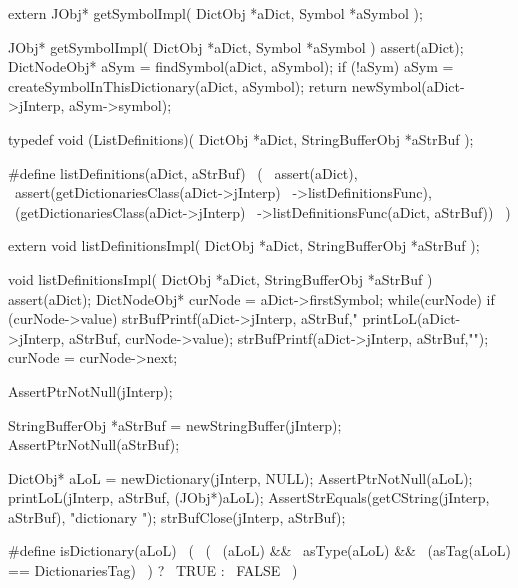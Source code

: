 \startCHeader
extern JObj* getSymbolImpl(
  DictObj *aDict,
  Symbol  *aSymbol
);
\stopCHeader
{}

\startCCode
JObj* getSymbolImpl(
  DictObj *aDict,
  Symbol  *aSymbol
) {
  assert(aDict);
  DictNodeObj* aSym = findSymbol(aDict, aSymbol);
  if (!aSym) {
    aSym = createSymbolInThisDictionary(aDict, aSymbol);
  }
  return newSymbol(aDict->jInterp, aSym->symbol);
}
\stopCCode
\stopTestSuite

\startTestSuite[listDefinitions]

\startCHeader
typedef void (ListDefinitions)(
  DictObj         *aDict,
  StringBufferObj *aStrBuf
);

#define listDefinitions(aDict, aStrBuf)         \
  (                                             \
    assert(aDict),                              \
    assert(getDictionariesClass(aDict->jInterp) \
      ->listDefinitionsFunc),                   \
    (getDictionariesClass(aDict->jInterp)       \
      ->listDefinitionsFunc(aDict, aStrBuf))    \
  )
\stopCHeader

\setCHeaderStream{private}
\startCHeader
extern void listDefinitionsImpl(
  DictObj         *aDict,
  StringBufferObj *aStrBuf
);
\stopCHeader
\setCHeaderStream{public}

\startCCode
void listDefinitionsImpl(
  DictObj         *aDict,
  StringBufferObj *aStrBuf
) {
  assert(aDict);
  DictNodeObj* curNode = aDict->firstSymbol;
  while(curNode) {
    if (curNode->value) {
      strBufPrintf(aDict->jInterp, aStrBuf,"%
      printLoL(aDict->jInterp, aStrBuf, curNode->value);
      strBufPrintf(aDict->jInterp, aStrBuf,"\n");
    }
    curNode = curNode->next;
  }
}
\stopCCode

\startTestCase[print Dictionary]
\startCTest
  AssertPtrNotNull(jInterp);

  StringBufferObj *aStrBuf = newStringBuffer(jInterp);
  AssertPtrNotNull(aStrBuf);

  DictObj* aLoL = newDictionary(jInterp, NULL);
  AssertPtrNotNull(aLoL);
  printLoL(jInterp, aStrBuf, (JObj*)aLoL);
  AssertStrEquals(getCString(jInterp, aStrBuf), "dictionary ");
  strBufClose(jInterp, aStrBuf);
\stopCTest
\stopTestCase
\stopTestSuite

\startTestSuite[isDictionary]
\startCHeader
#define isDictionary(aLoL)              \
  (                                     \
    (                                   \
      (aLoL) &&                         \
      asType(aLoL) &&                   \
      (asTag(aLoL) == DictionariesTag)  \
    ) ?                                 \
      TRUE :                            \
      FALSE                             \
  )
\stopCHeader
\stopTestSuite

